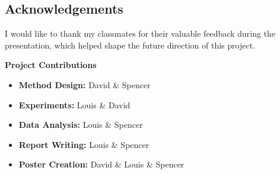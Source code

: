 \subsection{Acknowledgements}
I would like to thank my classmates for their valuable feedback during the presentation, which helped shape the future direction of this project.

\vspace{0.5em}
\textbf{Project Contributions}
\begin{itemize}
    \item \textbf{Method Design:} David \& Spencer
    \item \textbf{Experiments:} Louis \& David
    \item \textbf{Data Analysis:} Louis \& Spencer
    \item \textbf{Report Writing:} Louis \& Spencer
    \item \textbf{Poster Creation:} David \& Louis \& Spencer
\end{itemize}
